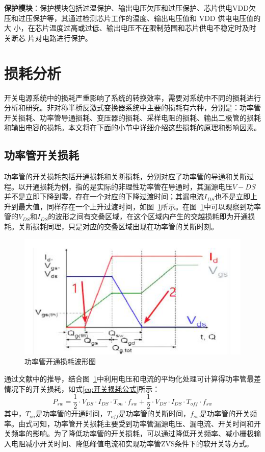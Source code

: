 \textbf{保护模块}：保护模块包括过温保护、输出电压欠压和过压保护、芯片供电VDD欠压和过压保护等，其通过检测芯片工作的温度、输出电压值和 VDD 供电电压值的大 小，在芯片温度过高或过低、输出电压不在限制范围和芯片供电不稳定时及时关断芯 片对电路进行保护。

\section{损耗分析}

开关电源系统中的损耗严重影响了系统的转换效率，需要对系统中不同的损耗进行分析和研究。非对称半桥反激式变换器系统中主要的损耗有六种，分别是：功率管开关损耗、功率管导通损耗、变压器的损耗、采样电阻的损耗、输出二极管的损耗和输出电容的损耗。本文将在下面的小节中详细介绍这些损耗的原理和影响因素。

\subsection{功率管开关损耗}

功率管的开关损耗包括开通损耗和关断损耗，分别对应了功率管的导通和关断过程。以开通损耗为例，指的是实际的非理性功率管在导通时，其漏源电压$V-{DS}$并不是立即下降到零，存在一个对应的下降过渡时间；其漏电流$I_{DS}$也不是立即上升到最大值，同样存在一个上升过渡时间，如图~\ref{fig:开关损耗图}所示。在图~\ref{fig:开关损耗图}中可以观察到功率管的$V_{DS}$和$I_{DS}$的波形之间有交叠区域，在这个区域内产生的交越损耗即为开通损耗。关断损耗同理，只是对应的交叠区域出现在功率管的关断时刻。

\begin{figure}[htbp] 
    \centering
    \includegraphics[width=0.6\linewidth]{figures/开关损耗图.png}
    \caption{功率管开通损耗波形图}
    \label{fig:开关损耗图}
\end{figure}

通过文献中的推导，结合图~\ref{fig:开关损耗图}中利用电压和电流的平均化处理可计算得功率管最差情况下的开关损耗，如式\eqref{eq:开关损耗公式}所示：
\begin{equation}
    \label{eq:开关损耗公式}
    P_{sw}=\frac{1}{2} \cdot V_{DS} \cdot I_{DS} \cdot T_{on} \cdot f_{sw} + \frac{1}{2} \cdot V_{DS} \cdot I_{DS} \cdot T_{off} \cdot f_{sw}
\end{equation}
其中，$T_{on}$是功率管的开通时间，$T_{off}$是功率管的关断时间，$f_{sw}$是功率管的开关频率。由式可知，功率管开关损耗主要受到功率管漏源电压、漏电流、开关时间和开关频率的影响。为了降低功率管的开关损耗，可以通过降低开关频率、减小栅极输入电阻减小开关时间、降低峰值电流和实现功率管ZVS条件下的软开关等方式。

